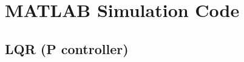 \chapter{MATLAB Simulation Code}
\label{ch: AppendixB}

\section{LQR (P controller)}
\label{ch:codeLQRsim}





